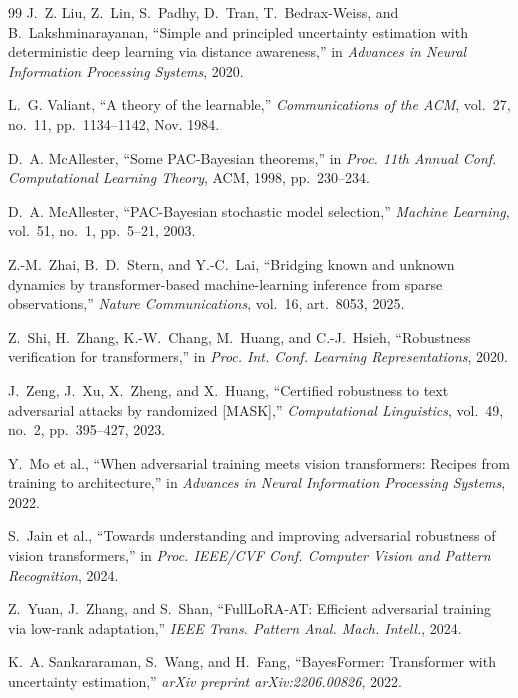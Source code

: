 \documentclass[12pt,a4paper]{article}
\theoremstyle{definition}
\begin{document}
\begin{thebibliography}{99}
J.~Z. Liu, Z.~Lin, S.~Padhy, D.~Tran, T.~Bedrax-Weiss, and B.~Lakshminarayanan, ``Simple and principled uncertainty estimation with deterministic deep learning via distance awareness,'' in \emph{Advances in Neural Information Processing Systems}, 2020.

L.~G. Valiant, ``A theory of the learnable,'' \emph{Communications of the ACM}, vol.~27, no.~11, pp.~1134--1142, Nov. 1984.

D.~A. McAllester, ``Some PAC-Bayesian theorems,'' in \emph{Proc. 11th Annual Conf. Computational Learning Theory}, ACM, 1998, pp.~230--234.

D.~A. McAllester, ``PAC-Bayesian stochastic model selection,'' \emph{Machine Learning}, vol.~51, no.~1, pp.~5--21, 2003.

Z.-M.~Zhai, B.~D.~Stern, and Y.-C.~Lai, ``Bridging known and unknown dynamics by transformer-based machine-learning inference from sparse observations,'' \emph{Nature Communications}, vol.~16, art.~8053, 2025.

Z.~Shi, H.~Zhang, K.-W.~Chang, M.~Huang, and C.-J.~Hsieh, ``Robustness verification for transformers,'' in \emph{Proc. Int. Conf. Learning Representations}, 2020.

J.~Zeng, J.~Xu, X.~Zheng, and X.~Huang, ``Certified robustness to text adversarial attacks by randomized [MASK],'' \emph{Computational Linguistics}, vol.~49, no.~2, pp.~395--427, 2023.

Y.~Mo et al., ``When adversarial training meets vision transformers: Recipes from training to architecture,'' in \emph{Advances in Neural Information Processing Systems}, 2022.

S.~Jain et al., ``Towards understanding and improving adversarial robustness of vision transformers,'' in \emph{Proc. IEEE/CVF Conf. Computer Vision and Pattern Recognition}, 2024.

Z.~Yuan, J.~Zhang, and S.~Shan, ``FullLoRA-AT: Efficient adversarial training via low-rank adaptation,'' \emph{IEEE Trans. Pattern Anal. Mach. Intell.}, 2024.

K.~A. Sankararaman, S.~Wang, and H.~Fang, ``BayesFormer: Transformer with uncertainty estimation,'' \emph{arXiv preprint arXiv:2206.00826}, 2022.


\end{thebibliography}
\end{document}
